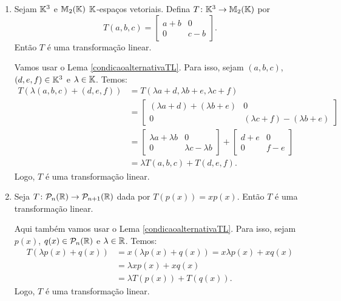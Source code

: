 \begin{exemplo}
\begin{enumerate}[label={\arabic*})]
        \item Sejam $\mathbb{K}^3$ e $\mathbb{M}_2(\mathbb{K})$ $\mathbb{K}$-espaços vetoriais. Defina $T \colon \mathbb{K}^3 \to \mathbb{M}_2(\mathbb{K})$ por
        \[
            T(a, b, c) = \begin{bmatrix}
            a+b & 0\\
            0 & c - b
            \end{bmatrix}.
        \]
        Então $T$ é uma transformação linear.
        \begin{solucao}
            Vamos usar o Lema \ref{condicaoalternativaTL}. Para isso, sejam $(a, b, c)$, $(d, e, f) \in \mathbb{K}^3$ e $\lambda \in \mathbb{K}$. Temos:
            \begin{align*}
                T(\lambda(a,b,c) + (d,e,f)) &= T(\lambda a + d, \lambda b + e, \lambda c + f) \\ &= \begin{bmatrix}
                (\lambda a + d) + (\lambda b + e) & 0\\
                0 & (\lambda c + f) - (\lambda b + e)
                \end{bmatrix} \\ &= \begin{bmatrix}
                \lambda a + \lambda b & 0\\
                0 & \lambda c - \lambda b
                \end{bmatrix} + \begin{bmatrix}
                d + e & 0\\
                0 & f - e
                \end{bmatrix} \\ &= \lambda T(a,b,c) + T(d,e,f).
            \end{align*}
            Logo, $T$ é uma transformação linear.
        \end{solucao}

        \item Seja $T \colon \mathcal{P}_n(\mathbb{R}) \to \mathcal{P}_{n + 1}(\mathbb{R})$ dada por $T(p(x)) = xp(x)$. Então $T$ é uma transformação linear.
        \begin{solucao}
            Aqui também vamos usar o Lema \ref{condicaoalternativaTL}. Para isso, sejam $p(x)$, $q(x) \in \mathcal{P}_n(\mathbb{R})$ e $\lambda \in \mathbb{R}$. Temos:
            \begin{align*}
                T(\lambda p(x) + q(x)) &= x(\lambda p(x) + q(x)) = x\lambda p(x) + xq(x) \\ &= \lambda xp(x) + xq(x) \\ &= \lambda T(p(x)) + T(q(x)).
            \end{align*}
            Logo, $T$ é uma transformação linear.
        \end{solucao}


\end{enumerate}
\end{exemplo}
